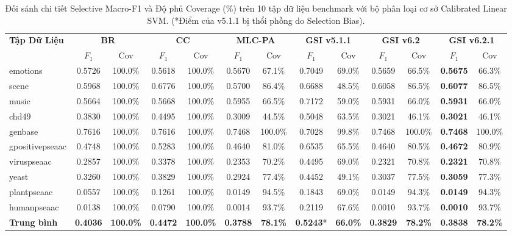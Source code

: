 \documentclass[10pt,a4paper,twoside]{article}
\begin{document}
\begin{table}[H]
\centering
\footnotesize
\setlength{\tabcolsep}{2.2pt}
\caption{Đối sánh chi tiết Selective Macro-F1 và Độ phủ Coverage (\%) trên 10 tập dữ liệu benchmark với bộ phân loại cơ sở Calibrated Linear SVM. (*Điểm của v5.1.1 bị thổi phồng do Selection Bias).}
\label{tab:svm_detail}
\vspace{0.4em}
\begin{tabular*}{\textwidth}{@{\extracolsep{\fill}}lcccccccccccc@{}}
\toprule
\multirow{2}{*}{\textbf{Tập Dữ Liệu}} & \multicolumn{2}{c}{\textbf{BR}} & \multicolumn{2}{c}{\textbf{CC}} & \multicolumn{2}{c}{\textbf{MLC-PA}} & \multicolumn{2}{c}{\textbf{GSI v5.1.1}} & \multicolumn{2}{c}{\textbf{GSI v6.2}} & \multicolumn{2}{c}{\textbf{GSI v6.2.1}} \\
\cmidrule(lr){2-3} \cmidrule(lr){4-5} \cmidrule(lr){6-7} \cmidrule(lr){8-9} \cmidrule(lr){10-11} \cmidrule(lr){12-13}
& $F_1$ & Cov & $F_1$ & Cov & $F_1$ & Cov & $F_1$ & Cov & $F_1$ & Cov & $F_1$ & Cov \\
\midrule
emotions & 0.5726 & 100.0\% & 0.5618 & 100.0\% & 0.5670 & 67.1\% & 0.7049 & 69.0\% & 0.5659 & 66.5\% & \textbf{0.5675} & 66.3\% \\
scene & 0.5968 & 100.0\% & 0.6776 & 100.0\% & 0.5700 & 86.4\% & 0.6688 & 48.5\% & 0.6058 & 86.5\% & \textbf{0.6077} & 86.5\% \\
music & 0.5664 & 100.0\% & 0.5668 & 100.0\% & 0.5955 & 66.5\% & 0.7172 & 59.0\% & 0.5931 & 66.0\% & \textbf{0.5931} & 66.0\% \\
chd49 & 0.3830 & 100.0\% & 0.4495 & 100.0\% & 0.3009 & 44.5\% & 0.5048 & 63.5\% & 0.3021 & 46.1\% & \textbf{0.3021} & 46.1\% \\
genbase & 0.7616 & 100.0\% & 0.7616 & 100.0\% & 0.7468 & 100.0\% & 0.7028 & 99.8\% & 0.7468 & 100.0\% & \textbf{0.7468} & 100.0\% \\
gpositivepseaac & 0.4748 & 100.0\% & 0.5283 & 100.0\% & 0.4640 & 81.0\% & 0.6535 & 65.5\% & 0.4640 & 80.5\% & \textbf{0.4672} & 80.9\% \\
viruspseaac & 0.2857 & 100.0\% & 0.3378 & 100.0\% & 0.2353 & 70.2\% & 0.4495 & 69.0\% & 0.2321 & 70.8\% & \textbf{0.2321} & 70.8\% \\
yeast & 0.3260 & 100.0\% & 0.3829 & 100.0\% & 0.2924 & 77.4\% & 0.4452 & 49.1\% & 0.3037 & 77.5\% & \textbf{0.3059} & 77.3\% \\
plantpseaac & 0.0557 & 100.0\% & 0.1261 & 100.0\% & 0.0149 & 94.5\% & 0.1843 & 69.0\% & 0.0149 & 94.3\% & \textbf{0.0149} & 94.3\% \\
humanpseaac & 0.0138 & 100.0\% & 0.0790 & 100.0\% & 0.0014 & 93.7\% & 0.2119 & 67.6\% & 0.0010 & 93.7\% & \textbf{0.0010} & 93.7\% \\
\midrule
\textbf{Trung bình} & \textbf{0.4036} & \textbf{100.0\%} & \textbf{0.4472} & \textbf{100.0\%} & \textbf{0.3788} & \textbf{78.1\%} & \textbf{0.5243}* & \textbf{66.0\%} & \textbf{0.3829} & \textbf{78.2\%} & \textbf{0.3838} & \textbf{78.2\%} \\
\bottomrule
\end{tabular*}
\end{table}
\end{document}
